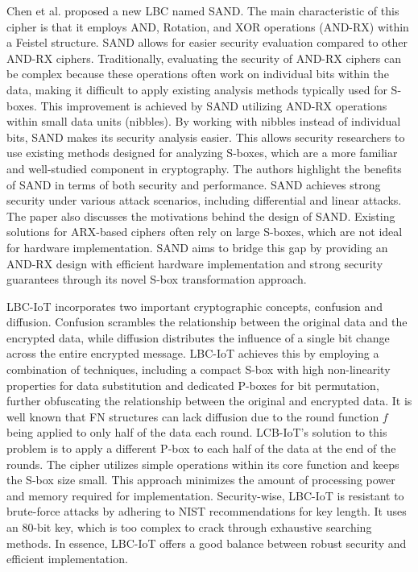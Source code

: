 \documentclass[conference]{IEEEtran}
\begin{document}
Chen et al. proposed a new LBC named SAND. The main characteristic of this cipher is that it employs AND, Rotation, and XOR operations (AND-RX) within a Feistel structure. SAND allows for easier security evaluation compared to other AND-RX ciphers. Traditionally, evaluating the security of AND-RX ciphers can be complex because these operations often work on individual bits within the data, making it difficult to apply existing analysis methods typically used for S-boxes. This improvement is achieved by SAND utilizing AND-RX operations within small data units (nibbles). By working with nibbles instead of individual bits, SAND makes its security analysis easier. This allows security researchers to use existing methods designed for analyzing S-boxes, which are a more familiar and well-studied component in cryptography. The authors highlight the benefits of SAND in terms of both security and performance. SAND achieves strong security under various attack scenarios, including differential and linear attacks. The paper also discusses the motivations behind the design of SAND. Existing solutions for ARX-based ciphers often rely on large S-boxes, which are not ideal for hardware implementation. SAND aims to bridge this gap by providing an AND-RX design with efficient hardware implementation and strong security guarantees through its novel S-box transformation approach.\cite{SAND}


LBC-IoT incorporates two important cryptographic concepts, confusion and diffusion. Confusion scrambles the relationship between the original data and the encrypted data, while diffusion distributes the influence of a single bit change across the entire encrypted message. LBC-IoT achieves this by employing a combination of techniques, including a compact S-box with high non-linearity properties for data substitution and dedicated P-boxes for bit permutation, further obfuscating the relationship between the original and encrypted data. It is well known that FN structures can lack diffusion due to the round function $f$ being applied to only half of the data each round. LCB-IoT's solution to this problem is to apply a different P-box to each half of the data at the end of the rounds. The cipher utilizes simple operations within its core function and keeps the S-box size small. This approach minimizes the amount of processing power and memory required for implementation. Security-wise, LBC-IoT is resistant to brute-force attacks by adhering to NIST recommendations for key length. It uses an 80-bit key, which is too complex to crack through exhaustive searching methods. In essence, LBC-IoT offers a good balance between robust security and efficient implementation.\cite{LBC-IoT}
\end{document}
